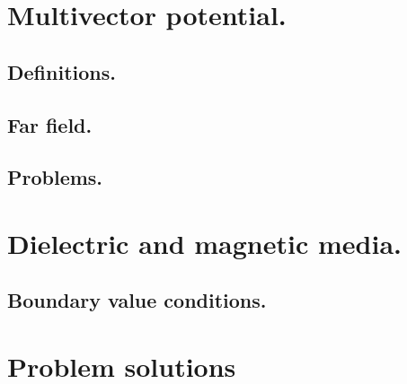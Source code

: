       \section{Multivector potential.}
         \subsection{Definitions.}
         
         
         \subsection{Far field.}
            
         \subsection{Problems.}
         
         
      \section{Dielectric and magnetic media.}
         
         \subsection{Boundary value conditions.}
            
      \section{Problem solutions}
         \shipoutAnswer
